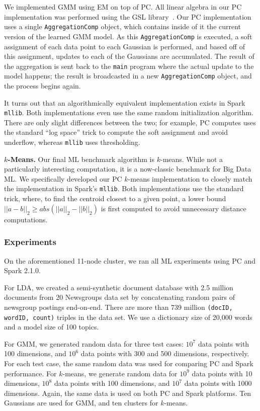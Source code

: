 We
implemented GMM using EM on top of PC.  All linear algebra in our PC implementation was performed using
the GSL library~\cite{gsl}.  
Our PC implementation uses a single \texttt{AggregationComp} object, which contains inside of it the current
version of the learned GMM model.  As this  \texttt{AggregationComp} is executed, a soft assignment of each
data point to each Gaussian is performed, and based off of this assignment, updates to each of the Gaussians
are accumulated.  The result of the aggregation is sent back to the \texttt{main} program where the actual update
to the model happens; the result is broadcasted in a new \texttt{AggregationComp} object, and the process begins again.

It turns out that an algorithmically equivalent implementation exists in Spark \texttt{mllib}.
Both implementations even use the same random initialization algorithm.
There are only slight differences between the two; for example, PC computes uses the standard ``log space'' trick to
compute the soft assignment and avoid underflow, whereas \texttt{mllib} uses thresholding.  

\vspace{5pt}
\noindent
\textbf{$k$-Means.} Our final ML benchmark algorithm is $k$-means.  
While not a particularly interesting computation, it is a now-classic
benchmark for Big Data ML.  We specifically developed our PC $k$-means implementation to closely match
the implementation in Spark's \texttt{mllib}.
Both implementations use the standard trick, where, to find the centroid closest to a given point,
a lower bound $||a - b||_2 \geq  abs(||a||_2 - ||b||_2)$ is
first computed to avoid unnecessary distance computations.

\subsubsection {Experiments}

On the aforementioned 11-node cluster, 
we ran all ML experiments using PC and Spark 2.1.0.

For LDA,  we
created a semi-synthetic document database with 2.5 million documents from
20 Newsgroups data set by concatenating random pairs of newsgroup postings
end-on-end. There are more than 739
million \texttt{(docID, wordID, count)} triples in the data set.
We use a dictionary size
of 20,000 words and a model size of 100 topics. 

For GMM, we generated
random data for three test cases: $10^7$ data
points with 100 dimensions, and $10^6$ data points with 300 and 500
dimensions, respectively. For each test case, the same random data was used
for comparing PC and Spark performance. For $k$-means, we
generate random data for $10^9$ data
points with 10 dimensions, $10^8$ data points with 100 dimensions,  and $10^7$
data points with 1000
dimensions. Again, the same data is used on both PC and
Spark platforms.
Ten Gaussians are used for GMM, and ten clusters for $k$-means.

